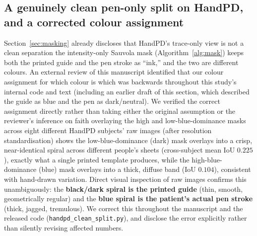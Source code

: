 \documentclass[3p,final,10pt]{elsarticle}
\let\oldsubsection\subsection
\renewcommand{\subsection}{\FloatBarrier\oldsubsection}
\begin{document}
\subsection{A genuinely clean pen-only split on HandPD, and a corrected colour assignment}
\label{sec:handpd-clean}
Section~\ref{sec:masking} already discloses that HandPD's trace-only view
is not a clean separation the intensity-only Sauvola mask
(Algorithm~\ref{alg:mask}) keeps both the printed guide and the pen stroke
as ``ink,'' and the two are different colours. An external review of this
manuscript identified that our colour assignment for which colour
is which was backwards throughout this study's internal code and text
(including an earlier draft of this section, which described the guide as
blue and the pen as dark/neutral). We verified the correct assignment
directly rather than taking either the original assumption or the
reviewer's inference on faith overlaying the high and low-blue-dominance
masks across eight different HandPD subjects' raw images (after
resolution standardisation) shows the low-blue-dominance (dark) mask
overlays into a crisp, near-identical spiral across different people's
sheets (cross-subject mean IoU $0.225$), exactly what a single printed
template produces, while the high-blue-dominance (blue) mask overlays into
a thick, diffuse band (IoU $0.104$), consistent with hand-drawn variation.
Direct visual inspection of raw images confirms this unambiguously: the
\textbf{black/dark spiral is the printed guide} (thin, smooth,
geometrically regular) and the \textbf{blue spiral is the patient's actual
pen stroke} (thick, jagged, tremulous). We correct this throughout the
manuscript and the released code (\texttt{handpd\_clean\_split.py}), and
disclose the error explicitly rather than silently revising affected
numbers.
\end{document}

